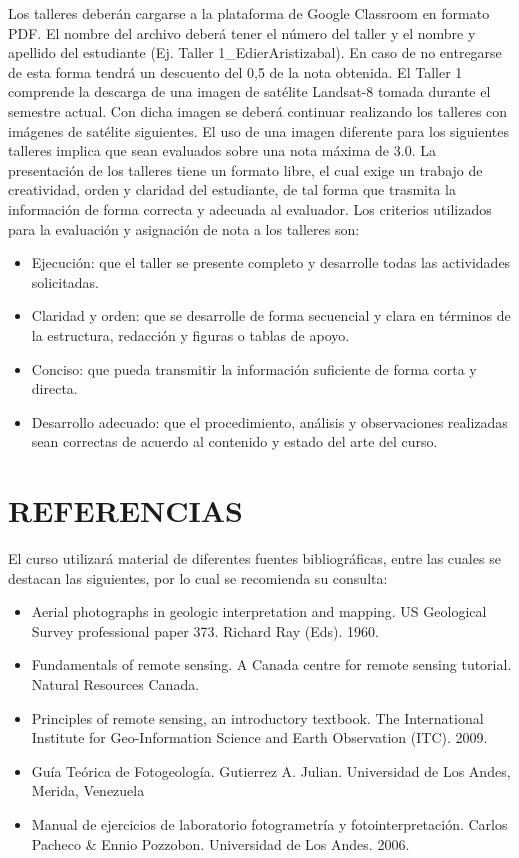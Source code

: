 \documentclass[a4paper,twoside,11pt,]{article}
\begin{document}
Los talleres deberán cargarse a la plataforma de Google Classroom en formato PDF. El nombre del archivo deberá tener el número del taller y el nombre y apellido del estudiante (Ej. Taller 1\_EdierAristizabal). En caso de no entregarse de esta forma tendrá un descuento del 0,5 de la nota obtenida.
El Taller 1 comprende la descarga de una imagen de satélite Landsat-8 tomada durante el semestre actual. Con dicha imagen se deberá continuar realizando los talleres con imágenes de satélite siguientes. El uso de una imagen diferente para los siguientes talleres implica que sean evaluados sobre una nota máxima de 3.0.
La presentación de los talleres tiene un formato libre, el cual exige un trabajo de creatividad, orden y claridad del estudiante, de tal forma que trasmita la información de forma correcta y adecuada al evaluador. Los criterios utilizados para la evaluación y asignación de nota a los talleres son:
\begin{itemize}
\item Ejecución: que el taller se presente completo y desarrolle todas las actividades solicitadas.
\item Claridad y orden: que se desarrolle de forma secuencial y clara en términos de la estructura, redacción y figuras o tablas de apoyo.
\item Conciso: que pueda transmitir la información suficiente de forma corta y directa.
\item Desarrollo adecuado: que el procedimiento, análisis y observaciones realizadas sean correctas de acuerdo al contenido y estado del arte del curso.
\end{itemize}

\section{REFERENCIAS}
El curso utilizará material de diferentes fuentes bibliográficas, entre las cuales se destacan las siguientes, por lo cual se recomienda su consulta:
\begin{itemize}
\item Aerial photographs in geologic interpretation and mapping. US Geological Survey professional paper 373. Richard Ray (Eds). 1960.
\item Fundamentals of remote sensing. A Canada centre for remote sensing tutorial. Natural Resources Canada. 
\item Principles of remote sensing, an introductory textbook. The International Institute for Geo-Information Science and Earth Observation (ITC). 2009.
\item Guía Teórica de Fotogeología. Gutierrez A. Julian. Universidad de Los Andes, Merida, Venezuela
\item Manual de ejercicios de laboratorio fotogrametría y fotointerpretación. Carlos Pacheco \& Ennio Pozzobon. Universidad de Los Andes. 2006.
\end{itemize}
\end{document}
